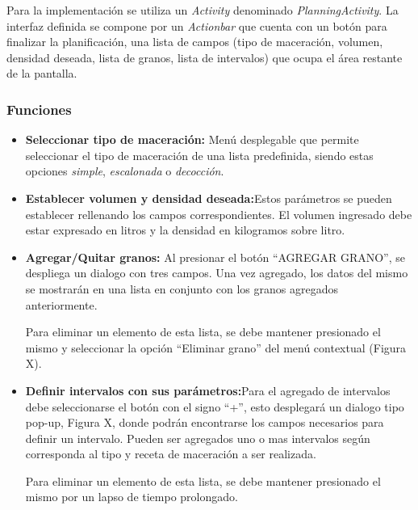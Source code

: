                 \par Para la implementación se utiliza un \textit{Activity} denominado \textit{PlanningActivity}. La interfaz definida se compone por un \textit{Actionbar} que cuenta con un botón para finalizar la planificación, una lista de campos (tipo de maceración, volumen, densidad deseada, lista de granos, lista de intervalos) que ocupa el área restante de la pantalla. 
                
            \subsubsection{Funciones}
                \begin{itemize}
                    \item \textbf{Seleccionar tipo de maceración:} Menú desplegable que permite seleccionar el tipo de maceración de una lista predefinida, siendo estas opciones \textit{simple}, \textit{escalonada} o \textit{decocción}.
                    
                    \item \textbf{Establecer volumen y densidad deseada:}Estos parámetros se pueden establecer rellenando los campos correspondientes. El volumen ingresado debe estar expresado en litros y la densidad en kilogramos sobre litro.
                    
                    \item \textbf{Agregar/Quitar granos:} Al presionar el botón ``AGREGAR GRANO'', se despliega un dialogo con tres campos. Una vez agregado, los datos del mismo se mostrarán en una lista en conjunto con los granos agregados anteriormente.
                    
                        \par Para eliminar un elemento de esta lista, se debe mantener presionado el mismo y seleccionar la opción ``Eliminar grano'' del menú contextual (Figura X).
                    
                    \item \textbf{Definir intervalos con sus parámetros:}Para el agregado de intervalos debe seleccionarse el botón con el signo ``+'', esto desplegará un dialogo tipo pop-up, Figura X, donde podrán encontrarse los campos necesarios para definir un intervalo. Pueden ser agregados uno o mas intervalos según corresponda al tipo y receta de maceración a ser realizada.
                        \par Para eliminar un elemento de esta lista, se debe mantener presionado el mismo por un lapso de tiempo prolongado.
                    

\end{itemize}
